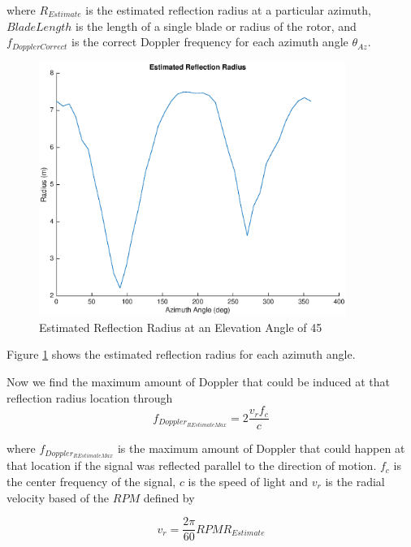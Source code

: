 where $R_{Estimate}$ is the estimated reflection radius at a particular azimuth, $BladeLength$ is the length of a single blade or radius of the rotor, and $f_{DopplerCorrect}$ is the correct Doppler frequency for each azimuth angle $\theta_{Az}$.

\begin{figure}
	\begin{center}
		\includegraphics[width=10cm]{images/results/Estimated_reflection_radius_Azimuth_range.eps}
		\caption{Estimated Reflection Radius at an Elevation Angle of 45\textdegree}
		\label{fig:est_radius_azimuth_range}
	\end{center}
\end{figure}

Figure \ref{fig:est_radius_azimuth_range} shows the estimated reflection radius for each azimuth angle.

Now we find the maximum amount of Doppler that could be induced at that reflection radius location through
\begin{equation}
	f_{Doppler_{R Estimate Max}} = 2\frac{v_r f_c}{c}
	\label{eqn:max_doppler}
\end{equation}

where $f_{Doppler_{R Estimate Max}}$ is the maximum amount of Doppler that could happen at that location if the signal was reflected parallel to the direction of motion. $f_c$ is the center frequency of the signal, $c$ is the speed of light and $v_r$ is the radial velocity based of the $RPM$ defined by

\begin{equation}
	v_r = \frac{2\pi}{60} RPM R_{Estimate}
	\label{eqn:v_radial}
\end{equation}

